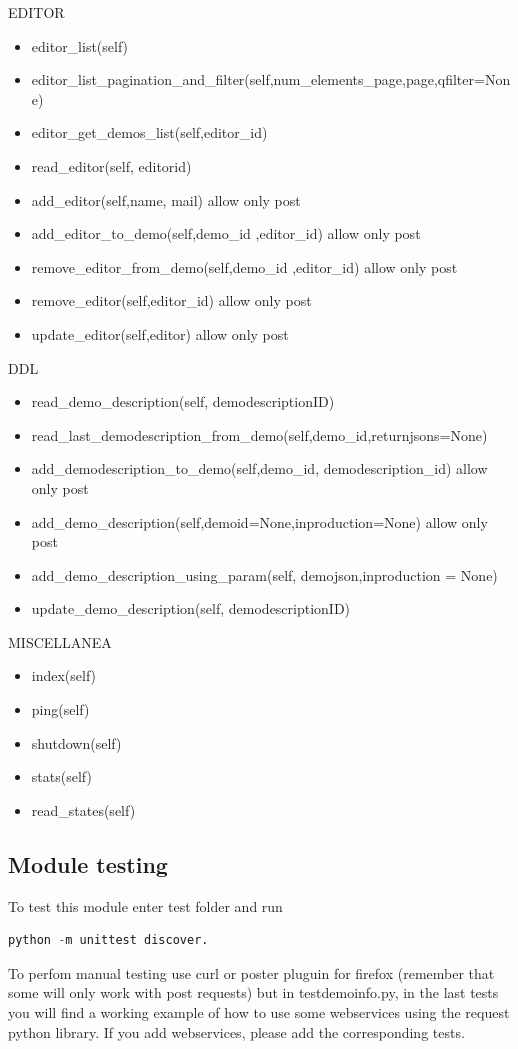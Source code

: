 EDITOR

\begin{itemize}
\item  editor\_list(self)
\item  editor\_list\_pagination\_and\_filter(self,num\_elements\_page,page,qfilter=None)
\item  editor\_get\_demos\_list(self,editor\_id)
\item  read\_editor(self, editorid)
\item  add\_editor(self,name, mail)
allow only post
\item  add\_editor\_to\_demo(self,demo\_id ,editor\_id)
allow only post
\item  remove\_editor\_from\_demo(self,demo\_id ,editor\_id)
allow only post
\item  remove\_editor(self,editor\_id)
allow only post
\item  update\_editor(self,editor)
allow only post
\end{itemize}

DDL

\begin{itemize}
\item  read\_demo\_description(self, demodescriptionID)
\item  read\_last\_demodescription\_from\_demo(self,demo\_id,returnjsons=None)
\item  add\_demodescription\_to\_demo(self,demo\_id, demodescription\_id)
allow only post
\item  add\_demo\_description(self,demoid=None,inproduction=None)
allow only post
\item  add\_demo\_description\_using\_param(self, demojson,inproduction = None)
\item  update\_demo\_description(self, demodescriptionID)
\end{itemize}

MISCELLANEA

\begin{itemize}
\item  index(self)
\item  ping(self)
\item  shutdown(self)
\item  stats(self)
\item  read\_states(self)
\end{itemize}


\subsection{Module testing}
To test this module enter test folder and run 
\begin{lstlisting}[language=Python,firstnumber=1]
python -m unittest discover.
\end{lstlisting}

To perfom manual testing use curl or poster pluguin for firefox (remember that some will only work with post requests) but in testdemoinfo.py, in the last tests you will find a working example of how to use some webservices using the request python library.
If you add webservices, please add the corresponding tests.
